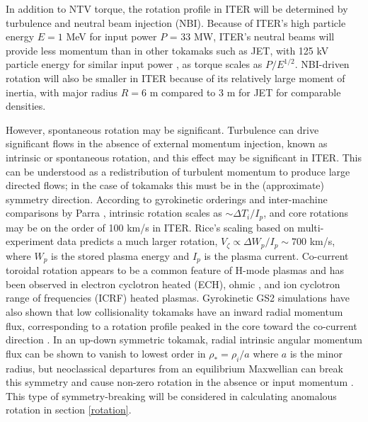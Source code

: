 \documentclass{article}
\numberwithin{figure}{section}
\numberwithin{equation}{section}
\begin{document}
In addition to NTV torque, the rotation profile in ITER will be determined by turbulence and neutral beam injection (NBI). 
Because of ITER's high particle energy $E = 1$ MeV for input power $P$ = 33 MW, ITER's neutral beams will provide less momentum than in other tokamaks such as JET, with 125 kV particle energy for similar input power \cite{Ciric2011}, as torque scales as $P/E^{1/2}$. NBI-driven rotation will also be smaller in ITER because of its relatively large moment of inertia, with major radius $R = 6$ m compared to 3 m for JET for comparable densities. 

However, spontaneous rotation may be significant. Turbulence can drive significant flows in the absence of external momentum injection, known as intrinsic or spontaneous rotation, and this effect may be significant in ITER. This can be understood as a redistribution of turbulent momentum to produce large directed flows; in the case of tokamaks this must be in the (approximate) symmetry direction. According to gyrokinetic orderings and inter-machine comparisons by Parra \cite{Parra2012}, intrinsic rotation scales as $\sim \Delta T_i/I_p$, and core rotations may be on the order of 100 km/s in ITER. Rice's scaling based on multi-experiment data \cite{Rice2007} predicts a much larger rotation, $V_{\zeta} \propto \Delta W_p/I_p \sim 700$ km/s, where $W_p$ is the stored plasma energy and $I_p$ is the plasma current. Co-current toroidal rotation appears to be a common feature of H-mode plasmas and has been observed in electron cyclotron heated (ECH)\cite{DeGrassie2007}, ohmic \cite{DeGrassie2007}, and ion cyclotron range of frequencies (ICRF) \cite{Noterdaeme2003} heated plasmas. Gyrokinetic GS2 simulations have also shown that low collisionality tokamaks have an inward radial momentum flux, corresponding to a rotation profile peaked in the core toward the co-current direction \cite{Barnes2013}. In an up-down symmetric tokamak, radial intrinsic angular momentum flux can be shown to vanish to lowest order in $\rho_* = \rho_i/a$ where $a$ is the minor radius, but neoclassical departures from an equilibrium Maxwellian can break this symmetry and cause non-zero rotation in the absence or input momentum \cite{Barnes2013}. This type of symmetry-breaking will be considered in calculating anomalous rotation in section \ref{rotation}. 
\end{document}

